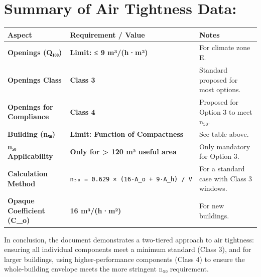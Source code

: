 \documentclass[
  10pt,
  letterpaper,
]{scrbook}
\begin{document}
\section{Summary of Air Tightness
Data:}\label{summary-of-air-tightness-data}

\begin{longtable}[]{@{}
  >{\raggedright\arraybackslash}p{}
  >{\raggedright\arraybackslash}p{}
  >{\raggedright\arraybackslash}p{}@{}}
\toprule\noalign{}
\begin{minipage}[b]{\linewidth}\raggedright
Aspect
\end{minipage} & \begin{minipage}[b]{\linewidth}\raggedright
Requirement / Value
\end{minipage} & \begin{minipage}[b]{\linewidth}\raggedright
Notes
\end{minipage} \\
\midrule\noalign{}
\endhead
\bottomrule\noalign{}
\endlastfoot
\textbf{Openings (Q₁₀₀)} & \textbf{Limit: ≤ 9 m³/(h·m²)} & For climate
zone E. \\
\textbf{Openings Class} & \textbf{Class 3} & Standard proposed for most
options. \\
\textbf{Openings for Compliance} & \textbf{Class 4} & Proposed for
Option 3 to meet n₅₀. \\
\textbf{Building (n₅₀)} & \textbf{Limit: Function of Compactness} & See
table above. \\
\textbf{n₅₀ Applicability} & \textbf{Only for \textgreater{} 120 m²
useful area} & Only mandatory for Option 3. \\
\textbf{Calculation Method} &
\texttt{n₅₀\ =\ 0.629\ ×\ (16·A\_o\ +\ 9·A\_h)\ /\ V} & For a standard
case with Class 3 windows. \\
\textbf{Opaque Coefficient (C\_o)} & \textbf{16 m³/(h·m²)} & For new
buildings. \\
\end{longtable}

In conclusion, the document demonstrates a two-tiered approach to air
tightness: ensuring all individual components meet a minimum standard
(Class 3), and for larger buildings, using higher-performance components
(Class 4) to ensure the whole-building envelope meets the more stringent
n₅₀ requirement.

\end{document}
